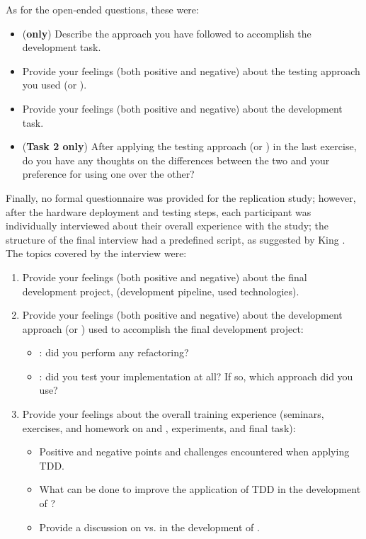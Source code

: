 \noindent As for the open-ended questions, these were:
\begin{itemize}
    \item (\textbf{\notdd only}) Describe the \notdd approach you have followed to accomplish the development task.
    \item Provide your feelings (both positive and negative) about the testing approach you used (\ie \tdd or \notdd).
    \item Provide your feelings (both positive and negative) about the development task.
    \item (\textbf{Task 2 only}) After applying the testing approach (\ie \tdd or \notdd) in the last exercise, do you have any thoughts on the differences between the two and your preference for using one over the other?
\end{itemize}

\noindent Finally, no formal questionnaire was provided for the replication study; however, after the hardware deployment and testing steps, each participant was individually interviewed about their overall experience with the study; the structure of the final interview had a predefined script, as suggested by King \cite{King:2004}. The topics covered by the interview were:
\begin{enumerate}
    \item Provide your feelings (both positive and negative) about the final development project, (\eg development pipeline, used technologies).
    \item Provide your feelings (both positive and negative) about the development approach (\ie \tdd or \notdd) used to accomplish the final development project:
        \begin{itemize}
            \item \tdd: did you perform any refactoring? 
            \item \notdd: did you test your implementation at all? If so, which approach did you use?
        \end{itemize}
    \item Provide your feelings about the overall training experience (seminars, exercises, and homework on \tdd and \notdd, experiments, and final task):
        \begin{itemize}
            \item Positive and negative points and challenges encountered when applying TDD.
            \item What can be done to improve the application of TDD in the development of \ess?
            \item Provide a discussion on \tdd vs. \notdd in the development of \ess.
        \end{itemize}
\end{enumerate}

